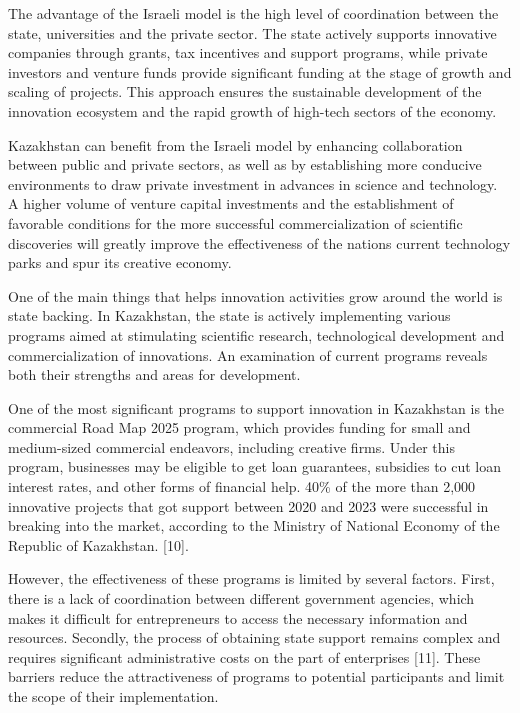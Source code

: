\begin{multicols}{2}
The advantage of the Israeli model is the high level of coordination
between the state, universities and the private sector. The state
actively supports innovative companies through grants, tax incentives
and support programs, while private investors and venture funds provide
significant funding at the stage of growth and scaling of projects. This
approach ensures the sustainable development of the innovation ecosystem
and the rapid growth of high-tech sectors of the economy.

Kazakhstan can benefit from the Israeli model by enhancing collaboration
between public and private sectors, as well as by establishing more
conducive environments to draw private investment in advances in science
and technology. A higher volume of venture capital investments and the
establishment of favorable conditions for the more successful
commercialization of scientific discoveries will greatly improve the
effectiveness of the nation\textquotesingle s current technology parks
and spur its creative economy.

One of the main things that helps innovation activities grow around the
world is state backing. In Kazakhstan, the state is actively
implementing various programs aimed at stimulating scientific research,
technological development and commercialization of innovations. An
examination of current programs reveals both their strengths and areas
for development.

One of the most significant programs to support innovation in Kazakhstan
is the commercial Road Map 2025 program, which provides funding for
small and medium-sized commercial endeavors, including creative firms.
Under this program, businesses may be eligible to get loan guarantees,
subsidies to cut loan interest rates, and other forms of financial help.
40\% of the more than 2,000 innovative projects that got support between
2020 and 2023 were successful in breaking into the market, according to
the Ministry of National Economy of the Republic of Kazakhstan.
{[}10{]}.

However, the effectiveness of these programs is limited by several
factors. First, there is a lack of coordination between different
government agencies, which makes it difficult for entrepreneurs to
access the necessary information and resources. Secondly, the process of
obtaining state support remains complex and requires significant
administrative costs on the part of enterprises {[}11{]}. These barriers
reduce the attractiveness of programs to potential participants and
limit the scope of their implementation.


\end{multicols}
